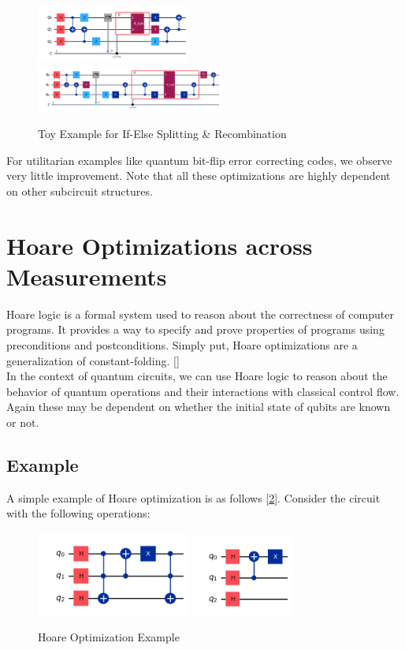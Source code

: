\documentclass[10pt]{article}
\begin{document}
\begin{figure}[h]
\centering
  \includegraphics[width=0.45\textwidth]{Images/toy1.png}
  \includegraphics[width=0.55\textwidth]{Images/toy2.png}
  \caption{Toy Example for If-Else Splitting \& Recombination}
  \label{fig:toy}
\end{figure}

For utilitarian examples like quantum bit-flip error correcting codes, we observe very little improvement. Note that all these optimizations are highly dependent on other subcircuit structures.

\section{Hoare Optimizations across Measurements}
Hoare logic is a formal system used to reason about the correctness of computer programs. It provides a way to specify and prove properties of programs using preconditions and postconditions. Simply put, Hoare optimizations are a generalization of constant-folding. [\cite{hoare}] \\

In the context of quantum circuits, we can use Hoare logic to reason about the behavior of quantum operations and their interactions with classical control flow. Again these may be dependent on whether the initial state of qubits are known or not.

\subsection{Example}
A simple example of Hoare optimization is as follows [\ref{fig:hoare}]. Consider the circuit with the following operations:

\begin{figure}[h]
\centering
  \includegraphics[width=0.45\textwidth]{Images/hoare_s1.png}
  \includegraphics[width=0.30\textwidth]{Images/hoare_s2.png}
  \caption{Hoare Optimization Example}
  \label{fig:hoare}
\end{figure}
\end{document}
